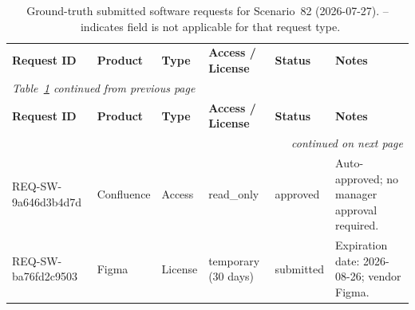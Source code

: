 {\small\begin{longtable}{
  p{}
  p{}
  p{}
  p{}
  p{}
  p{}}
\captionsetup{font=small}
\caption{Ground-truth submitted software requests for Scenario~82 (2026-07-27).
{--}~indicates field is not applicable for that request type.}
\label{tab:scenario82-requests} \\
\toprule
\textbf{Request ID} &
\textbf{Product} &
\textbf{Type} &
\textbf{Access / License} &
\textbf{Status} &
\textbf{Notes} \\
\midrule
\endfirsthead
\multicolumn{6}{l}{\emph{Table~\ref{tab:scenario82-requests} continued from previous page}} \\
\toprule
\textbf{Request ID} &
\textbf{Product} &
\textbf{Type} &
\textbf{Access / License} &
\textbf{Status} &
\textbf{Notes} \\
\midrule
\endhead
\midrule \multicolumn{6}{r}{\emph{continued on next page}} \\
\endfoot
\bottomrule
\endlastfoot

REQ-SW-9a646d3b4d7d & Confluence & Access  & read\_only           & approved  & Auto-approved; no manager approval required. \\
REQ-SW-ba76fd2c9503 & Figma      & License & temporary (30 days)  & submitted & Expiration date: 2026-08-26; vendor Figma. \\

\end{longtable}}